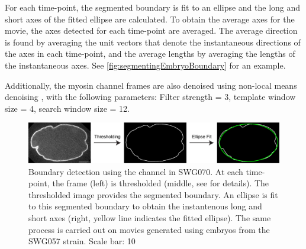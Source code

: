For each time-point, the segmented boundary is fit to an ellipse and the long and short axes of the fitted ellipse are calculated. To obtain the average axes for the movie, the axes detected for each time-point are averaged. The average direction is found by averaging the unit vectors that denote the instantaneous directions of the axes in each time-point, and the average lengths by averaging the lengths of the instantaneous axes. See \autoref{fig:segmentingEmbryoBoundary} for an example.

Additionally, the myosin channel frames are also denoised using non-local means denoising \citep{buades2011non}, with the following parameters: Filter strength = \SI{3}{\pixels}, template window size = \SI{4}{\pixels}, search window size = \SI{12}{\pixels}. 

\begin{figure}[H]
\centering
\includegraphics[width=\textwidth]{ExpMethods/FigTrackingPipeline/boundaryDetect.png}
\caption[Image analysis: Segmenting embryo boundary]{Boundary detection using the  channel in SWG070. At each time-point, the frame (left) is thresholded (middle, see  for details). The thresholded image provides the segmented boundary. An ellipse is fit to this segmented boundary to obtain the instantenous long and short axes (right, yellow line indicates the fitted ellipse). The same process is carried out on movies generated using embryos from the SWG057 strain. Scale bar: \SI{10}{\unitLength}}
\label{fig:segmentingEmbryoBoundary}
\end{figure}

